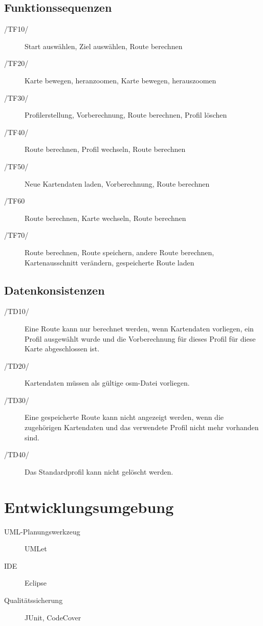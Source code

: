 \documentclass[a4paper, 11pt]{article}
\begin{document}
\subsection{Funktionssequenzen}
\begin{description}
\item[/TF10/]
Start auswählen, Ziel auswählen, Route berechnen\\
\item[/TF20/]
Karte bewegen, heranzoomen, Karte bewegen, herauszoomen\\
\item[/TF30/]
Profilerstellung, Vorberechnung, Route berechnen, Profil löschen\\
\item[/TF40/]
Route berechnen, Profil wechseln, Route berechnen\\
\item[/TF50/]
Neue Kartendaten laden, Vorberechnung, Route berechnen\\
\item[/TF60]
Route berechnen, Karte wechseln, Route berechnen\\
\item[/TF70/]
Route berechnen, Route speichern, andere Route berechnen, Kartenausschnitt verändern, gespeicherte Route laden\\
\end{description}
\subsection{Datenkonsistenzen}
\begin{description}
\item[/TD10/]
Eine Route kann nur berechnet werden, wenn Kartendaten vorliegen, ein Profil ausgewählt wurde und die Vorberechnung für dieses Profil für diese Karte abgeschlossen ist.\\
\item[/TD20/]
Kartendaten müssen als gültige osm-Datei vorliegen.\\
\item[/TD30/]
Eine gespeicherte Route kann nicht angezeigt werden, wenn die zugehörigen Kartendaten und das verwendete Profil nicht mehr vorhanden sind.\\
\item[/TD40/]
Das Standardprofil kann nicht gelöscht werden.\\
\end{description}
\section{Entwicklungsumgebung}
\begin{description}
  \item[UML-Planungswerkzeug] UMLet
  \item[IDE] Eclipse
  \item[Qualitätssicherung] JUnit, CodeCover
\end{description}
\end{document}
